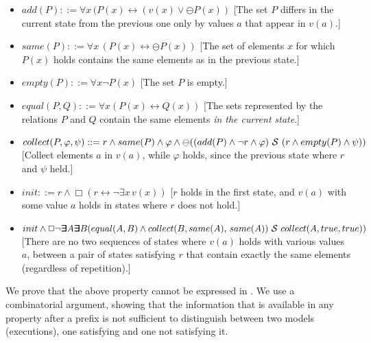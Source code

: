 \documentclass{llncs}
\newcommand{\Exists}{\bm{\exists}\kern-0.6em\bm{\exists}}
\begin{document}
\begin{itemize}
\item $add(P) ::= \forall x \, (P(x) \leftrightarrow (v(x) \vee \ominus P(x))$ [The set $P$ differs in the current state from the previous one only by values $a$ that appear in $v(a)$.]
\item $same(P) ::= \forall x \, (P(x) \leftrightarrow \ominus P(x))$ 
[The set of elements $x$ for which
$P (x)$ holds
contains the same elements as in the previous state.]
\item $empty (P) ::= \forall x \neg P(x)$ [The set $P$ is empty.]
\item $equal (P,Q) ::= \forall x (P(x) \leftrightarrow Q(x))$ 
[The sets represented by the relations
$P$ and $Q$ contain the same elements {\em in the current state}.]
\item $collect(P, \varphi, \psi) ::=
       r \wedge same(P) \wedge \varphi \wedge 
       \ominus ((add(P)\wedge \neg r \wedge \varphi) \ {\cal S} \ (r \wedge empty(P) \wedge \psi))$  [Collect elements $a$ in $v(a)$, while $\varphi$ holds, 
       since the previous state where $r$ 
       and $\psi$ held.]
\item $init ::= r \wedge \Box (r \leftrightarrow \neg \exists x \, v(x))$ [$r$ holds in the first state, and $v(a)$ with some value $a$ holds in states where $r$ does not hold.]
\item $init \wedge \Box \neg \Exists A \Exists B (equal (A, B) \wedge \\
collect(B, same(A),\, same(A)) \ \since \ collect(A, true, true))$
[There are no two sequences of states where $v(a)$ holds
with various values $a$, between a pair of states satisfying $r$ that contain exactly the same elements (regardless of repetition).]
\end{itemize}



\iffalse
We prove that the above property cannot be expressed in \EPFLTL{}.
We use a combinatorial argument, showing that
the information that is available in any \EPFLTL{}
property
after a prefix is not sufficient to distinguish between two models (executions), one satisfying and one not satisfying it.
\end{document}
